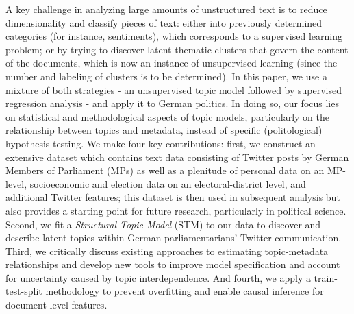 A key challenge in analyzing large amounts of unstructured text is to reduce dimensionality and classify pieces of text: either into previously determined categories (for instance, sentiments), which corresponds to a supervised learning problem; or by trying to discover latent thematic clusters that govern the content of the documents, which is now an instance of unsupervised learning (since the number and labeling of clusters is to be determined). In this paper, we use a mixture of both strategies - an unsupervised topic model followed by supervised regression analysis - and apply it to German politics. In doing so, our focus lies on statistical and methodological aspects of topic models, particularly on the relationship between topics and metadata, instead of specific (politological) hypothesis testing. We make four key contributions: first, we construct an extensive dataset which contains text data consisting of Twitter posts by German Members of Parliament (MPs) as well as a plenitude of personal data on an MP-level, socioeconomic and election data on an electoral-district level, and additional Twitter features; this dataset is then used in subsequent analysis but also provides a starting point for future research, particularly in political science. Second, we fit a \textit{Structural Topic Model} (STM) to our data to discover and describe latent topics within German parliamentarians' Twitter communication. Third, we critically discuss existing approaches to estimating topic-metadata relationships and develop new tools to improve model specification and account for uncertainty caused by topic interdependence. And fourth, we apply a train-test-split methodology to prevent overfitting and enable causal inference for document-level features.

